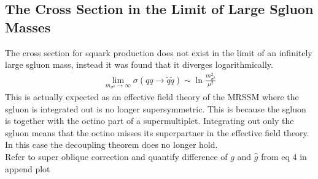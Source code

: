 \subsection{The Cross Section in the Limit of Large Sgluon Masses}
The cross section for squark production does not exist in the limit of an infinitely large sgluon mass, instead it was found that it diverges logarithmically.\\
\begin{align}
\lim_{m_{\sigma^0}\to\infty} \sigma(qq \to \tilde{q}\tilde{q}) \sim \ln \frac{m_{\sigma^0}^2}{\mu^2}
\end{align}
This is actually expected as an effective field theory of the MRSSM where the sgluon is integrated out is no longer supersymmetric. This is because the sgluon is together with the octino part of a supermultiplet. Integrating out only the sgluon means that the octino misses its superpartner in the effective field theory. In this case the decoupling theorem \cite{Appelquist:1974tg} does no longer hold.\\
Refer to super oblique correction and quantify difference of $g$ and $\hat{g}$ from eq 4 in \cite{Cheng:1997sq}\\
append plot